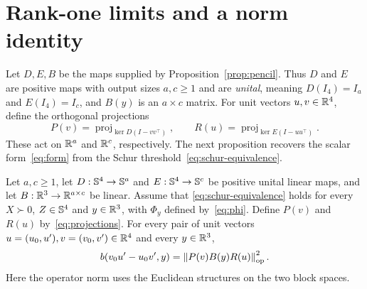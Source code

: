 \section{Rank-one limits and a norm identity}
\label{sec:norm}

Let $D,E,B$ be the maps supplied by Proposition~\ref{prop:pencil}.
Thus $D$ and $E$ are positive maps with output sizes $a,c\geq1$ and
are \emph{unital}, meaning $D(I_4)=I_a$ and $E(I_4)=I_c$,
and $B(y)$ is an $a\times c$ matrix.
For unit vectors $u,v\in\mathbb R^4$, define the orthogonal projections
\begin{equation}
 P(v)=\operatorname{proj}_{\ker D(I-vv^\top)},
 \qquad
 R(u)=\operatorname{proj}_{\ker E(I-uu^\top)}.
 \label{eq:projections}
\end{equation}
These act on $\mathbb R^a$ and $\mathbb R^c$, respectively.
The next proposition recovers the scalar form~\eqref{eq:form} from the
Schur threshold~\eqref{eq:schur-equivalence}.

\begin{proposition}
\label{prop:norm}
Let $a,c\geq1$, let $D:\mathbb S^4\to\mathbb S^a$ and
$E:\mathbb S^4\to\mathbb S^c$ be positive unital linear maps, and let
$B:\mathbb R^3\to\mathbb R^{a\times c}$ be linear. Assume that
\eqref{eq:schur-equivalence} holds for every $X\succ0$,
$Z\in\mathbb S^4$ and $y\in\mathbb R^3$, with $\Phi_y$ defined
by~\eqref{eq:phi}. Define $P(v)$ and $R(u)$ by~\eqref{eq:projections}.
For every pair of unit vectors $u=(u_0,u'),v=(v_0,v')\in\mathbb R^4$
and every $y\in\mathbb R^3$,
\begin{equation}
 b(v_0u'-u_0v',y)
 =\left\lVert P(v)B(y)R(u)\right\rVert_{\mathrm{op}}^{2}.
 \label{eq:norm-identity}
\end{equation}
Here the operator norm uses the Euclidean structures on the two block spaces.
\end{proposition}

